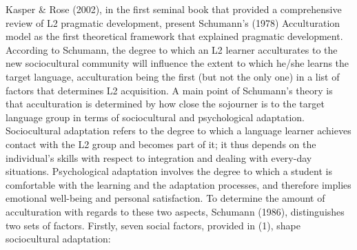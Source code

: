 \documentclass[12pt]{article}
\newenvironment{styleStandard}{\setlength\leftskip{0cm}\setlength\rightskip{0cm plus 1fil}\setlength\parindent{0cm}\setlength\parfillskip{0pt plus 1fil}\setlength\parskip{0in plus 1pt}\writerlistparindent\writerlistleftskip\leavevmode\normalfont\normalsize\writerlistlabel\ignorespaces}{\unskip\vspace{0.111in plus 0.0111in}\par}
\newcommand\writerlistleftskip{}
\newcommand\writerlistparindent{}
\newcommand\writerlistlabel{}
\begin{document}
\begin{styleStandard}
Kasper \& Rose (2002), in the first seminal book that provided a comprehensive review of L2 pragmatic development, present Schumann’s (1978) Acculturation model as the first theoretical framework that explained pragmatic development. According to Schumann, the degree to which an L2 learner acculturates to the new sociocultural community will influence the extent to which he/she learns the target language, acculturation being the first (but not the only one) in a list of factors that determines L2 acquisition. A main point of Schumann’s theory is that acculturation is determined by how close the sojourner is to the target language group in terms of sociocultural and psychological adaptation. Sociocultural adaptation refers to the degree to which a language learner achieves contact with the L2 group and becomes part of it; it thus depends on the individual’s skills with respect to integration and dealing with every-day situations. Psychological adaptation involves the degree to which a student is comfortable with the learning and the adaptation processes, and therefore implies emotional well-being and personal satisfaction. To determine the amount of acculturation with regards to these two aspects, Schumann (1986), distinguishes two sets of factors. Firstly, seven social factors, provided in (1), shape sociocultural adaptation: 
\end{styleStandard}
\end{document}
